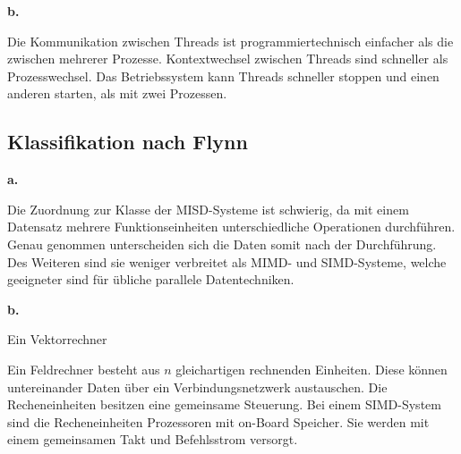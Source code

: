 \documentclass[12pt]{article}
\begin{document}
\noindent \textbf{b.}

Die Kommunikation zwischen Threads ist programmiertechnisch einfacher als die zwischen mehrerer Prozesse. Kontextwechsel zwischen Threads sind schneller als Prozesswechsel. Das Betriebssystem kann Threads schneller stoppen und einen anderen starten, als mit zwei Prozessen.

\subsection{Klassifikation nach Flynn}

\noindent \textbf{a.}

Die Zuordnung zur Klasse der MISD-Systeme ist schwierig, da mit einem Datensatz mehrere Funktionseinheiten unterschiedliche Operationen durchführen. Genau genommen unterscheiden sich die Daten somit nach der Durchführung. Des Weiteren sind sie weniger verbreitet als MIMD- und SIMD-Systeme, welche geeigneter sind für übliche parallele Datentechniken.

\noindent \textbf{b.}

Ein Vektorrechner

Ein Feldrechner besteht aus $n$ gleichartigen rechnenden Einheiten. Diese können untereinander Daten über ein Verbindungsnetzwerk austauschen. Die Recheneinheiten besitzen eine gemeinsame Steuerung. Bei einem SIMD-System sind die Recheneinheiten Prozessoren mit on-Board Speicher. Sie werden mit einem gemeinsamen Takt und Befehlsstrom versorgt.
\end{document}
